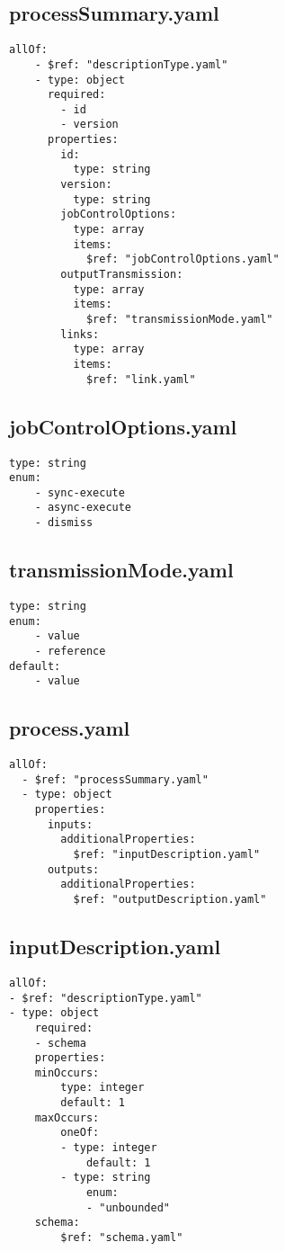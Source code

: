 \subsection{processSummary.yaml}
\begin{lstlisting}[caption={processSummary.yaml}, style = JSON]
allOf:
    - $ref: "descriptionType.yaml"
    - type: object
      required:
        - id
        - version
      properties:
        id:
          type: string
        version:
          type: string
        jobControlOptions:
          type: array
          items:
            $ref: "jobControlOptions.yaml"
        outputTransmission:
          type: array
          items:
            $ref: "transmissionMode.yaml"
        links:
          type: array
          items:
            $ref: "link.yaml"
\end{lstlisting}\label{appendixprocessSummaryyaml} 

\subsection{jobControlOptions.yaml}
\begin{lstlisting}[caption={jobControlOptions.yaml}, style = JSON]
type: string
enum:
    - sync-execute
    - async-execute
    - dismiss
\end{lstlisting}\label{appendixjobControlOptionsyaml} 

\subsection{transmissionMode.yaml}
\begin{lstlisting}[caption={transmissionMode.yaml}, style = JSON]
type: string
enum:
    - value
    - reference
default:
    - value
\end{lstlisting}\label{appendixtransmissionModeyaml} 

\subsection{process.yaml}
\begin{lstlisting}[caption={process.yaml}, style = JSON]
allOf:
  - $ref: "processSummary.yaml"
  - type: object
    properties:
      inputs:
        additionalProperties:
          $ref: "inputDescription.yaml"
      outputs:
        additionalProperties:
          $ref: "outputDescription.yaml"
\end{lstlisting}\label{appendixprocessyaml} 

\subsection{inputDescription.yaml}
\begin{lstlisting}[caption={inputDescription.yaml}, style = JSON]
allOf:
- $ref: "descriptionType.yaml"
- type: object
    required:
    - schema
    properties:
    minOccurs:
        type: integer
        default: 1
    maxOccurs:
        oneOf:
        - type: integer
            default: 1
        - type: string
            enum:
            - "unbounded"
    schema:
        $ref: "schema.yaml"
\end{lstlisting}\label{appendixinputDescriptionyaml} 

